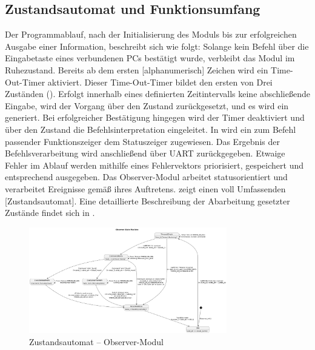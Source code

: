 \newpage
\subsection{Zustandsautomat und Funktionsumfang}
\label{sec:ZustaendeUndFunktionen}

Der Programmablauf, nach der Initialisierung des Moduls bis zur erfolgreichen Ausgabe einer Information, beschreibt sich wie folgt:
Solange kein Befehl \"uber die Eingabetaste eines verbundenen PCs best\"atigt wurde, verbleibt das Modul im Ruhezustand. Bereits ab dem ersten [alphanumerisch] Zeichen wird ein \glqq{}Time-Out-Timer\grqq{} aktiviert. Dieser Time-Out-Timer bildet den ersten von Drei Zust\"anden (). Erfolgt innerhalb eines definierten Zeitintervalls keine abschlie{\ss}ende Eingabe, wird der Vorgang \"uber den Zustand  zur\"uckgesetzt, und es wird ein  generiert. Bei erfolgreicher Best\"atigung hingegen wird der Timer deaktiviert und \"uber den Zustand  die Befehlsinterpretation eingeleitet. In  wird ein zum Befehl passender Funktionszeiger dem Statuszeiger zugewiesen. Das Ergebnis der Befehlsverarbeitung wird anschlie{\ss}end \"uber UART zur\"uckgegeben. Etwaige Fehler im Ablauf werden mithilfe eines Fehlervektors priorisiert, gespeichert und entsprechend ausgegeben. Das Observer-Modul arbeitet statusorientiert und verarbeitet Ereignisse gem\"a{\ss} ihres Auftretens.  zeigt einen voll Umfassenden [Zustandsautomat].
Eine detaillierte Beschreibung der Abarbeitung gesetzter Zust\"ande findet sich in .

\newpage
\begin{figure}[h!]
	\centering
	\includegraphics[angle=270, width=0.77\textwidth]{../Bilder/observer_state_machine.png}
	\caption{Zustandsautomat -- Observer-Modul}
	\label{fig:StateMachine_ObserverModul}
\end{figure}

